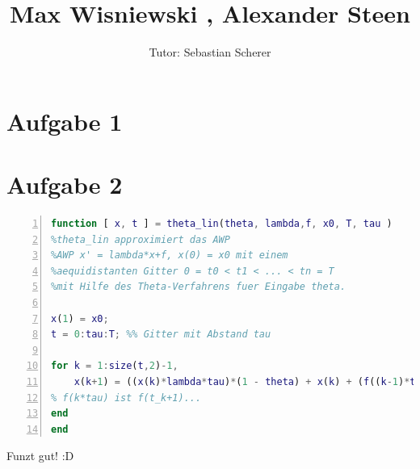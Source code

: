 \documentclass[11pt,a4paper,ngerman]{article}
\author{Tutor: Sebastian Scherer}
\date{}
\title{Max Wisniewski , Alexander Steen}
\begin{document}

\maketitle
\thispagestyle{fancy}



\section*{Aufgabe 1}

\section*{Aufgabe 2}

\begin{lstlisting}[language=matlab, numbers=left]
function [ x, t ] = theta_lin(theta, lambda,f, x0, T, tau )
%theta_lin approximiert das AWP
%AWP x' = lambda*x+f, x(0) = x0 mit einem
%aequidistanten Gitter 0 = t0 < t1 < ... < tn = T
%mit Hilfe des Theta-Verfahrens fuer Eingabe theta.

x(1) = x0;
t = 0:tau:T; %% Gitter mit Abstand tau

for k = 1:size(t,2)-1,
    x(k+1) = ((x(k)*lambda*tau)*(1 - theta) + x(k) + (f((k-1)*tau)*tau)*(1+theta)+ theta*tau*f(k*tau))/(1-tau*lambda*theta);
% f(k*tau) ist f(t_k+1)...
end
end
\end{lstlisting}

Funzt gut! :D
\end{document}

